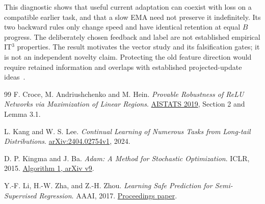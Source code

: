 \documentclass[11pt,a4paper]{article}
\begin{document}
This diagnostic shows that useful current adaptation can coexist with loss
on a compatible earlier task, and that a slow EMA need not preserve it
indefinitely. Its two backward rules only change speed and have identical
retention at equal $B$ progress. The deliberately chosen feedback and label
are not established empirical IT$^3$ properties. The result motivates the
vector study and its falsification gates; it is not an independent novelty
claim. Protecting the old feature direction would require retained
information and overlaps with established projected-update ideas~\cite{ogd}.

\begin{thebibliography}{99}\small
{} F. Croce, M. Andriushchenko and M. Hein.
\emph{Provable Robustness of ReLU Networks via Maximization of Linear Regions}.
\href{https://proceedings.mlr.press/v89/croce19a.html}{AISTATS 2019},
Section 2 and Lemma 3.1.

 L. Kang and W. S. Lee.
\emph{Continual Learning of Numerous Tasks from Long-tail Distributions}.
\href{https://arxiv.org/html/2404.02754v1}{arXiv:2404.02754v1}, 2024.

 D. P. Kingma and J. Ba. \emph{Adam: A Method for Stochastic Optimization}.
ICLR, 2015. \href{https://arxiv.org/pdf/1412.6980v9}{Algorithm 1, arXiv v9}.

 Y.-F. Li, H.-W. Zha, and Z.-H. Zhou.
\emph{Learning Safe Prediction for Semi-Supervised Regression}. AAAI, 2017.
\href{https://ojs.aaai.org/index.php/AAAI/article/download/10856/10715}{Proceedings paper}.


\end{thebibliography}
\end{document}

